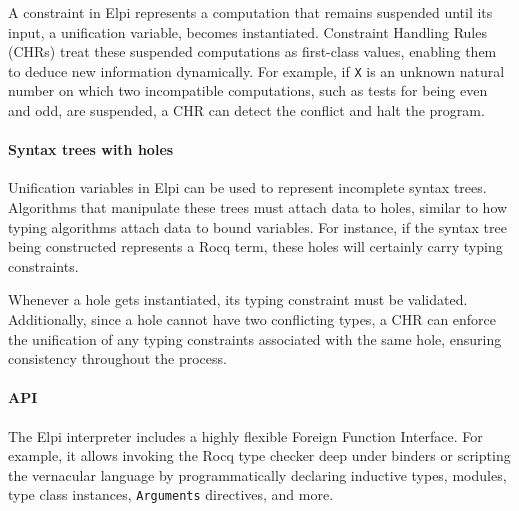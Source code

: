 \documentclass[sigplan,natbib=false]{acmart}
\begin{document}
A constraint in Elpi represents a computation that remains suspended until its
input, a unification variable, becomes instantiated. Constraint Handling Rules (CHRs)
treat these suspended computations as first-class values,
enabling them to deduce new information dynamically.
For example, if \texttt{X} is an unknown natural number on which two incompatible
computations, such as tests for being even and odd, are suspended,
a CHR can detect the conflict and halt the program.

\paragraph{Syntax trees with holes}

Unification variables in Elpi can be used to represent incomplete syntax trees.
Algorithms that manipulate these trees must attach data to holes,
similar to how typing algorithms attach data to bound variables.
For instance, if the syntax tree being constructed represents a Rocq term,
these holes will certainly carry typing constraints. 

Whenever a hole gets instantiated, its typing constraint must be validated.
Additionally, since a hole cannot have two conflicting types, a CHR can enforce
the unification of any typing constraints associated with the same hole,
ensuring consistency throughout the process.

\paragraph{API}

The Elpi interpreter includes a highly flexible Foreign Function
Interface. For example, it allows invoking the Rocq type checker
deep under binders or scripting the vernacular language by
programmatically declaring inductive types, modules, type class
instances, \texttt{Arguments} directives, and more.
\end{document}
